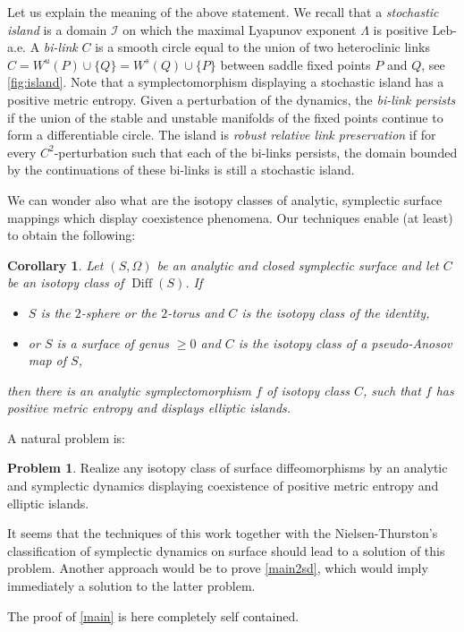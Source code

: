 \documentclass[JEP,XML,SOM,Unicode,NoFloatCountersInSection,Unicode,published]{cedram}
\newcommand \cI{{\mathcal I}}
\newcommand\leb{\mathrm{Leb}}
\DeclareMathOperator\Diff{Diff}
\newtheorem{corollary}[theo]{Corollary}
\theoremstyle{definition}
\newtheorem{problem}[proposition]{Problem}
\begin{document}
Let us explain the meaning of the above statement. We recall that a \emph{stochastic island} is a domain $\cI$ on which the maximal Lyapunov exponent $\Lambda$ is positive $\leb$-a.e. A \emph{bi-link} $C$ is a smooth circle equal to the union of two heteroclinic links $C= W^u(P)\cup \{Q\}= W^s(Q)\cup \{P\}$ between saddle fixed points $P$ and $Q$, see \cref{fig:island}.
Note that a symplectomorphism displaying a stochastic island has a positive metric entropy. Given a perturbation of the dynamics, the \emph{bi-link persists} if the union of the stable and unstable manifolds of the fixed points continue to form a differentiable circle. The island is \emph{robust relative link preservation} if for every $C^2$-perturbation such that each of the bi-links persists, the domain bounded by the continuations of these bi-links is still a stochastic island.

We can wonder also what are the isotopy classes of analytic, symplectic surface mappings which display coexistence phenomena. Our techniques enable (at least) to obtain the following:
\begin{corollary}\label{coro isotopy}
Let $(S,\Omega)$ be an analytic and closed symplectic surface and let $C$ be an isotopy class of $\Diff(S)$. If
\begin{itemize}
\item $S$ is the $2$-sphere or the $2$-torus and $C$ is the isotopy class of the identity,
\item or $S$ is a surface of genus $\ge 0$ and $C$ is the isotopy class of a pseudo-Anosov map of $S$,
\end{itemize}
then there is an analytic symplectomorphism $f$ of isotopy class $C$, such that $f$ has positive metric entropy and displays elliptic islands.
\end{corollary}
A natural problem is:
\begin{problem}Realize any isotopy class of surface diffeomorphisms by an analytic and symplectic dynamics displaying coexistence of positive metric entropy and elliptic islands.
\end{problem}
 It seems that the techniques of this work together with the Nielsen-Thurston's classification of symplectic dynamics on surface should lead to a solution of this problem. Another approach would be to prove \cref{main2sd}, which would imply immediately a solution to the latter problem.

The proof of \cref{main} is here completely self contained.
\end{document}
